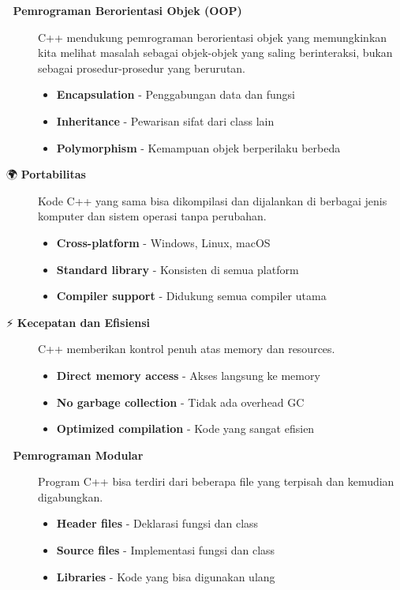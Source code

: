 \begin{description}

\item[🎯 \textbf{Pemrograman Berorientasi Objek (OOP)}]
C++ mendukung pemrograman berorientasi objek yang memungkinkan kita melihat masalah sebagai objek-objek yang saling berinteraksi, bukan sebagai prosedur-prosedur yang berurutan.

\begin{itemize}
\item \textbf{Encapsulation} - Penggabungan data dan fungsi
\item \textbf{Inheritance} - Pewarisan sifat dari class lain
\item \textbf{Polymorphism} - Kemampuan objek berperilaku berbeda
\end{itemize}

\item[🌍 \textbf{Portabilitas}]
Kode C++ yang sama bisa dikompilasi dan dijalankan di berbagai jenis komputer dan sistem operasi tanpa perubahan.

\begin{itemize}
\item \textbf{Cross-platform} - Windows, Linux, macOS
\item \textbf{Standard library} - Konsisten di semua platform
\item \textbf{Compiler support} - Didukung semua compiler utama
\end{itemize}

\item[⚡ \textbf{Kecepatan dan Efisiensi}]
C++ memberikan kontrol penuh atas memory dan resources.

\begin{itemize}
\item \textbf{Direct memory access} - Akses langsung ke memory
\item \textbf{No garbage collection} - Tidak ada overhead GC
\item \textbf{Optimized compilation} - Kode yang sangat efisien
\end{itemize}

\item[🔧 \textbf{Pemrograman Modular}]
Program C++ bisa terdiri dari beberapa file yang terpisah dan kemudian digabungkan.

\begin{itemize}
\item \textbf{Header files} - Deklarasi fungsi dan class
\item \textbf{Source files} - Implementasi fungsi dan class
\item \textbf{Libraries} - Kode yang bisa digunakan ulang
\end{itemize}


\end{description}
